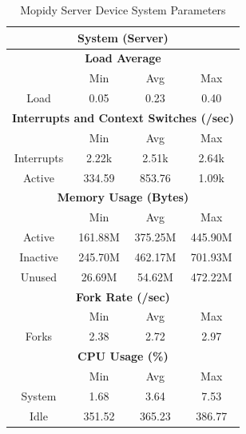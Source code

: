 \documentclass[11pt,a4paper]{scrreprt}
\begin{document}
\begin{table}[H]
\centering
    \begin{tabular}{||c|c|c|c|c|c|c||}
    \hline
    \multicolumn{7}{|c|}{\textbf{System (Server)}} \\
    \hline
    \multicolumn{7}{|c|}{\textbf{Load Average}} \\
    \hline\hline
      & \multicolumn{2}{|c|}{Min} & \multicolumn{2}{|c|}{Avg} & \multicolumn{2}{|c|}{Max} \\
    \hline
    Load & \multicolumn{2}{|c|}{0.05} & \multicolumn{2}{|c|}{0.23} & \multicolumn{2}{|c|}{0.40} \\
    \hline\hline
    \multicolumn{7}{|c|}{\textbf{Interrupts and Context Switches (/sec)}} \\
    \hline
      & \multicolumn{2}{|c|}{Min} & \multicolumn{2}{|c|}{Avg} & \multicolumn{2}{|c|}{Max} \\
    \hline
    Interrupts & \multicolumn{2}{|c|}{2.22k} & \multicolumn{2}{|c|}{2.51k} & \multicolumn{2}{|c|}{2.64k} \\
    \hline
    Active & \multicolumn{2}{|c|}{334.59} & \multicolumn{2}{|c|}{853.76} & \multicolumn{2}{|c|}{1.09k} \\
    \hline\hline
    \multicolumn{7}{|c|}{\textbf{Memory Usage (Bytes)}} \\
    \hline\hline
      & \multicolumn{2}{|c|}{Min} & \multicolumn{2}{|c|}{Avg} & \multicolumn{2}{|c|}{Max} \\
    \hline
    Active & \multicolumn{2}{|c|}{161.88M} & \multicolumn{2}{|c|}{375.25M} & \multicolumn{2}{|c|}{445.90M} \\
    \hline
    Inactive & \multicolumn{2}{|c|}{245.70M} & \multicolumn{2}{|c|}{462.17M} & \multicolumn{2}{|c|}{701.93M} \\
    \hline
    Unused & \multicolumn{2}{|c|}{26.69M} & \multicolumn{2}{|c|}{54.62M} & \multicolumn{2}{|c|}{472.22M} \\
    \hline\hline
    \multicolumn{7}{|c|}{\textbf{Fork Rate (/sec)}} \\
    \hline\hline
      & \multicolumn{2}{|c|}{Min} & \multicolumn{2}{|c|}{Avg} & \multicolumn{2}{|c|}{Max} \\
    \hline
    Forks & \multicolumn{2}{|c|}{2.38} & \multicolumn{2}{|c|}{2.72} & \multicolumn{2}{|c|}{2.97} \\
    \hline\hline
    \multicolumn{7}{|c|}{\textbf{CPU Usage (\%)}} \\
    \hline\hline
      & \multicolumn{2}{|c|}{Min} & \multicolumn{2}{|c|}{Avg} & \multicolumn{2}{|c|}{Max} \\
    \hline
    System & \multicolumn{2}{|c|}{1.68} & \multicolumn{2}{|c|}{3.64} & \multicolumn{2}{|c|}{7.53} \\
    \hline
    Idle & \multicolumn{2}{|c|}{351.52} & \multicolumn{2}{|c|}{365.23} & \multicolumn{2}{|c|}{386.77} \\
    \hline\hline
    \end{tabular}
    \caption{Mopidy Server Device System Parameters}
    \label{MopidyserverSysTab}
\end{table}
\end{document}
